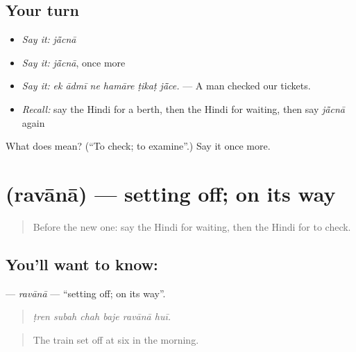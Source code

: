 \subsection*{Your turn}
\begin{itemize}
\raggedright
  \item \emph{Say it:} \emph{jā̃cnā}
  \item \emph{Say it:} \emph{jā̃cnā}, once more
  \item \emph{Say it:} \emph{ek ādmī ne hamāre ṭikaṭ jā̃ce.} — A man checked our tickets.
  \item \emph{Recall:} say the Hindi for a berth, then the Hindi for waiting, then say \emph{jā̃cnā} again
\end{itemize}

\begin{tcolorbox}[breakable,colback=teal!4,colframe=teal!35!black,title={Before you move on}]
What does  mean? (\textquotedblleft{}To check; to examine\textquotedblright{}.) Say it once more.
\end{tcolorbox}
\section[\texorpdfstring{\hi{रवाना} (ravānā)}{रवाना (ravānā)}]{ (ravānā) — setting off; on its way}

\label{lesson:HI-C400-ravana}



\begin{quote}
Before the new one: say the Hindi for waiting, then the Hindi for to check.
\end{quote}

\subsection*{You'll want to know: }
\textbf{} — \emph{ravānā} — \textquotedblleft{}setting off; on its way\textquotedblright{}.

\begin{quote}
     
\end{quote}

\begin{quote}
\emph{ṭren subah chah baje ravānā huī.}
\end{quote}

\begin{quote}
The train set off at six in the morning.
\end{quote}

